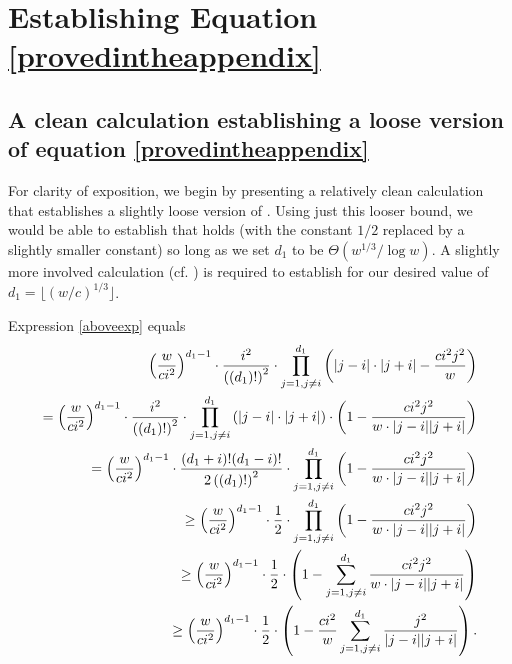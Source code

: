 \appendix
\section{Establishing Equation \protect\ref*{provedintheappendix}}

\label{app}

%
\subsection{A clean calculation establishing a loose version of equation
\protect\ref*{provedintheappendix}}

For clarity of exposition, we begin by presenting a relatively clean
calculation that establishes a slightly loose version of 
. Using just this looser bound, we would be able to
establish that  holds (with the constant $1/2$
replaced by a slightly smaller constant) so long as we set $d_1$ to be $
\Theta\left(w^{1/3}/\log w \right)$. A slightly more involved calculation
(cf. ) is required to establish 
 for our desired value of $d_1= \lfloor (w/c)^{1/3}
\rfloor$.

Expression \eqref{aboveexp} equals
\begin{align}
\left(\frac{w}{ci^2}\right)^{d_1-1} \cdot \frac{i^2}{\left((d_1)!\right)^2}
\cdot \prod_{j=1, j \neq i}^{d_1}\left( \left|j-i| \cdot |j+i\right| - \frac{
c i^2 j^2}{w}\right)  \notag \\
= \left(\frac{w}{ci^2}\right)^{d_1-1} \cdot \frac{i^2}{\left((d_1)!\right)^2}
\cdot \prod_{j=1, j \neq i}^{d_1}\left( \left|j-i| \cdot |j+i\right| \right)
\cdot \left(1-\frac{c i^2 j^2}{w \cdot |j-i| |j+i|}\right)  \notag \\
= \left(\frac{w}{ci^2}\right)^{d_1-1} \cdot \frac{(d_1+i)! (d_1-i)!}{
2\left((d_1)!\right)^2} \cdot \prod_{j=1, j \neq i}^{d_1} \left(1-\frac{c
i^2 j^2}{w \cdot |j-i| |j+i|}\right)  \label{looseversion} \\
\geq \left(\frac{w}{ci^2}\right)^{d_1-1} \cdot \frac{1}{2} \cdot \prod_{j=1,
j \neq i}^{d_1} \left(1-\frac{c i^2 j^2}{w \cdot |j-i| |j+i|}\right)  \notag
\\
\geq \left(\frac{w}{ci^2}\right)^{d_1-1} \cdot \frac{1}{2} \cdot
\left(1-\sum_{j=1, j \neq i }^{d_1}\frac{c i^2 j^2}{w \cdot |j-i| |j+i|}
\right)  \notag \\
\geq \left(\frac{w}{ci^2}\right)^{d_1-1} \cdot \frac{1}{2} \cdot \left(1-
\frac{c i^2}{w}\sum_{j=1, j \neq i }^{d_1}\frac{j^2}{ |j-i| |j+i|}\right).
\label{loosemiddle}
\end{align}


